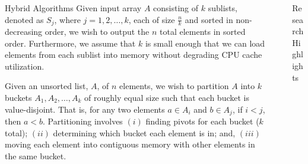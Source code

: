 \documentclass[final]{beamer}
\newlength{\sepwidth}
\newlength{\colwidth}
\newcommand{\separatorcolumn}{\begin{column}{\sepwidth}\end{column}}
\begin{document}
\begin{frame}[t]
\begin{columns}[t]
\begin{column}{\colwidth}
\begin{block}{Hybrid Algorithms}
   Given input array $A$ consisting of $k$ sublists, denoted as $S_j$, 
   where $j=1, 2,\ldots,k$, each of size  $\frac{n}{k}$ and sorted in non-decreasing order, we wish to output the $n$ total elements 
   in sorted order. Furthermore, we assume that $k$ is small enough that we can load elements 
   from each sublist into memory without degrading CPU cache utilization.


Given an unsorted list, $A$, of $n$ elements, we wish to partition $A$ into $k$ buckets $A_1, A_2, \ldots, A_k$ of roughly equal size such that each bucket is value-disjoint.  That is, for any two elements $a \in A_i$ and $b \in A_j$, if $i < j$, then $a<b$. Partitioning involves $(i)$ finding pivots for each bucket ($k$ total); $(ii)$ determining which bucket each element is in; and, $(iii)$ moving each element into contiguous memory with other elements in the same bucket.  

  \end{block}

\end{column}

\separatorcolumn

\begin{column}{\colwidth}

  \begin{block}{Research Highlights}



\end{block}
\end{column}
\end{columns}
\end{frame}
\end{document}
